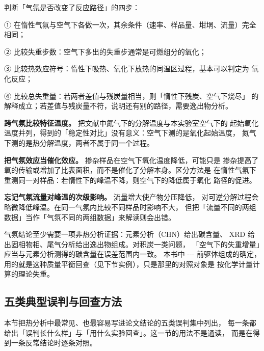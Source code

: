 \begin{dataflow}
判断「气氛是否改变了反应路径」的四步：

① 在惰性气氛与空气下各做一次，其余条件（速率、样品量、坩埚、流量）完全相同；

② 比较失重步数：空气下多出的失重步通常是可燃组分的氧化；

③ 比较热效应符号：惰性下吸热、氧化下放热的同温区过程，基本可以判定为
氧化反应；

④ 比较总失重量：若两者差值与残炭量相当，则「惰性下残炭、空气下烧尽」
的解释成立；若差值与残炭量不符，说明还有别的路径，需要逸出物分析。
\end{dataflow}

\begin{pitfall}
\textbf{跨气氛比较特征温度。} 把文献中氮气下的分解温度与本实验室空气下的
起始氧化温度并列，得到的「稳定性对比」没有意义：空气下测的是氧化起始温度，
氮气下测的是热分解温度，两者不属于同一个过程。

\textbf{把气氛效应当催化效应。} 掺杂样品在空气下氧化温度降低，可能只是
掺杂提高了氧的传输或增加了比表面积，而不是催化了分解本身。区分方法是
在惰性气氛下重测同一对样品：若惰性下的峰温不降，则空气下的降低属于氧化
路径的促进。

\textbf{忘记气氛流量对峰温的次级影响。} 流量增大使产物分压降低，
对可逆分解过程会略微降低峰温。在同一气氛内比较不同样品时影响不大，
但把「流量不同的两组数据」当作「气氛不同的两组数据」来解读则会出错。
\end{pitfall}

\begin{crosscheck}
气氛结论至少需要一项非热分析证据：元素分析（CHN）给出碳含量、
XRD 给出固相物相、尾气分析给出逸出物组成。对积炭一类问题，
「空气下的失重增量」应当与元素分析测得的碳含量在误差范围内一致。
本书中 --- 前驱体组成的确定，
用的就是这种质量平衡回查（见下节实例），只是那里的对照对象是
按化学计量计算的理论失重。
\end{crosscheck}

\subsection{五类典型误判与回查方法}

\begin{probout}
本节把热分析中最常见、也最容易写进论文结论的五类误判集中列出，
每一条都给出「误判长什么样」与「用什么实验回查」。这一节的用法不是通读，
而是在得到一条反常结论时逐条对照。
\end{probout}

